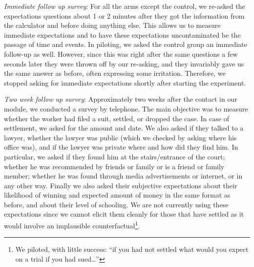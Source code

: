 \documentclass[12 pt]{article}
\begin{document}
\emph{Immediate follow up survey}: For all the arms except the control, we re-asked the expectations questions about 1 or 2 minutes after they got the information from the calculator and before doing anything else. This allows us to measure immediate expectations and to have these expectations uncontaminated be the passage of time and events. In piloting, we asked the control group an immediate follow-up as well. However, since this was right after the same questions a few seconds later they were thrown off by our re-asking, and they invariably gave us the same answer as before, often expressing some irritation. Therefore, we stopped asking for immediate expectations shortly after starting the experiment.

\emph{Two week follow up survey}: Approximately two weeks after the contact in our module, we conducted a survey by telephone. The main objective was to measure whether the worker had filed a suit, settled, or dropped the case. In case of settlement, we asked for the amount and date. We also asked if they talked to a lawyer, whether the lawyer was public (which we checked by asking where his office was), and if the lawyer was private where and how did they find him. In particular, we asked if they found him at the stairs/entrance of the court; whether he was recommended by friends or family or is a friend or family member; whether he was found through media advertisements or internet, or in any other way. Finally we also asked their subjective expectations about their likelihood of winning and expected amount of money in the same format as before, and about their level of schooling. We are not currently using these expectations since we cannot elicit them cleanly for those that have settled as it would involve an implausible counterfactual\footnote{We piloted, with little success: “if you had not settled what would you expect on a trial if you had sued…”}. 
\end{document}
